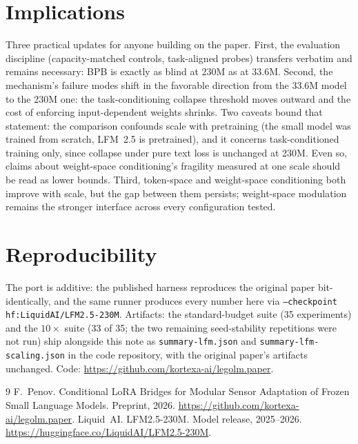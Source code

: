 \documentclass[11pt]{article}
\begin{document}
\section{Implications}
Three practical updates for anyone building on the paper. First, the evaluation discipline (capacity-matched controls, task-aligned probes) transfers verbatim and remains necessary: BPB is exactly as blind at 230M as at 33.6M. Second, the mechanism's failure modes shift in the favorable direction from the 33.6M model to the 230M one: the task-conditioning collapse threshold moves outward and the cost of enforcing input-dependent weights shrinks. Two caveats bound that statement: the comparison confounds scale with pretraining (the small model was trained from scratch, LFM~2.5 is pretrained), and it concerns task-conditioned training only, since collapse under pure text loss is unchanged at 230M. Even so, claims about weight-space conditioning's fragility measured at one scale should be read as lower bounds. Third, token-space and weight-space conditioning both improve with scale, but the gap between them persists; weight-space modulation remains the stronger interface across every configuration tested.

\section*{Reproducibility}
The port is additive: the published harness reproduces the original paper bit-identically, and the same runner produces every number here via \texttt{--checkpoint hf:LiquidAI/LFM2.5-230M}. Artifacts: the standard-budget suite (35 experiments) and the $10\times$ suite (33 of 35; the two remaining seed-stability repetitions were not run) ship alongside this note as \texttt{summary-lfm.json} and \texttt{summary-lfm-scaling.json} in the code repository, with the original paper's artifacts unchanged. Code: \url{https://github.com/kortexa-ai/legolm.paper}.

\begin{thebibliography}{9}
 F.~Penov. Conditional LoRA Bridges for Modular Sensor Adaptation of Frozen Small Language Models. Preprint, 2026. \url{https://github.com/kortexa-ai/legolm.paper}.
 Liquid~AI. LFM2.5-230M. Model release, 2025--2026. \url{https://huggingface.co/LiquidAI/LFM2.5-230M}.
\end{thebibliography}
\end{document}
